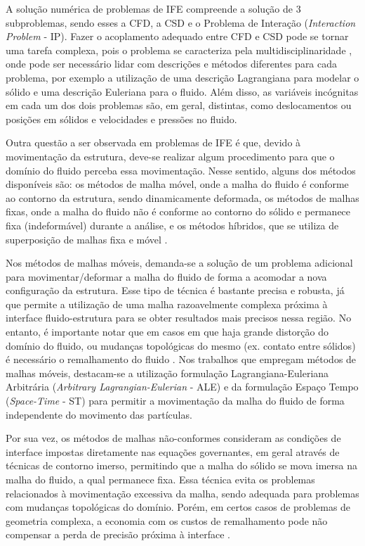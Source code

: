A solução numérica de problemas de IFE compreende a solução de 3 subproblemas, sendo esses a CFD, a CSD e o Problema de Interação (\textit{Interaction Problem} - IP). Fazer o acoplamento adequado entre CFD e CSD pode se tornar uma tarefa complexa, pois o problema se caracteriza pela multidisciplinaridade \cite{hou2012numerical}, onde pode ser necessário lidar com descrições e métodos diferentes para cada problema, por exemplo a utilização de uma descrição Lagrangiana para modelar o sólido e uma descrição Euleriana para o fluido. Além disso, as variáveis incógnitas em cada um dos dois problemas são, em geral, distintas, como deslocamentos ou posições em sólidos e velocidades e pressões no fluido.

Outra questão a ser observada em problemas de IFE é que, devido à movimentação da estrutura, deve-se realizar algum procedimento para que o domínio do fluido perceba essa movimentação. Nesse sentido, alguns dos métodos disponíveis são: os métodos de malha móvel, onde a malha do fluido é conforme ao contorno da estrutura, sendo dinamicamente deformada, os métodos de malhas fixas, onde a malha do fluido não é conforme ao contorno do sólido e permanece fixa (indeformável) durante a análise, e os métodos híbridos, que se utiliza de superposição de malhas fixa e móvel \cite{fernandes2020tecnica}.

Nos métodos de malhas móveis, demanda-se a solução de um problema adicional para movimentar/deformar a malha do fluido de forma a acomodar a nova configuração da estrutura. Esse tipo de técnica é bastante precisa e robusta, já que permite a utilização de uma malha razoavelmente complexa próxima à interface fluido-estrutura para se obter resultados mais precisos nessa região. No entanto, é importante notar que em casos em que haja grande distorção do domínio do fluido, ou mudanças topológicas do mesmo (ex. contato entre sólidos) é necessário o remalhamento do fluido \cite{terahara2020heart}.  Nos trabalhos que empregam métodos de malhas móveis, destacam-se a utilização formulação Lagrangiana-Euleriana Arbitrária (\textit{Arbitrary Lagrangian-Eulerian} - ALE) \cite{donea1982arbitrary,kanchi20073d,fernandes2019ale} e da formulação Espaço Tempo (\textit{Space-Time} - ST) \cite{takizawa2011multiscale,terahara2020heart,takizawa2011stabilized} para permitir a movimentação da malha do fluido de forma independente do movimento das partículas.

Por sua vez, os métodos de malhas não-conformes consideram as condições de interface impostas diretamente nas equações governantes, em geral através de técnicas de contorno imerso, permitindo que a malha do sólido se mova imersa na malha do fluido, a qual permanece fixa. Essa técnica evita os problemas relacionados à movimentação excessiva da malha, sendo adequada para problemas com mudanças topológicas do domínio. Porém, em certos casos de problemas de geometria complexa, a economia com os custos de remalhamento pode não compensar a perda de precisão próxima à interface \cite{bazilevs2013computational,hou2012numerical,bazilevs2015ale}.

